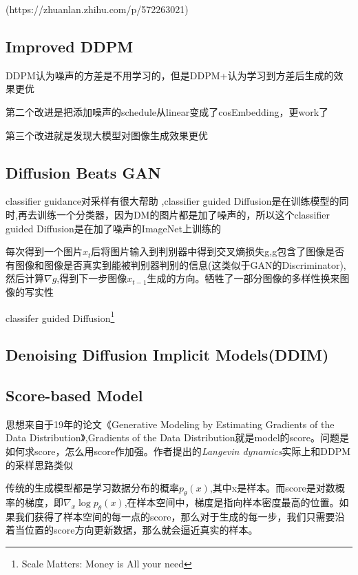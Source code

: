 \documentclass[12pt, a4paper, oneside]{ctexart}
\begin{document}
(https://zhuanlan.zhihu.com/p/572263021)





\subsection{Improved DDPM}
\par
DDPM认为噪声的方差是不用学习的，但是DDPM+认为学习到方差后生成的效果更优
\par
第二个改进是把添加噪声的schedule从linear变成了cosEmbedding，更work了
\par
第三个改进就是发现大模型对图像生成效果更优
\subsection{Diffusion Beats GAN}
\textcolor[rgb]{1,0,0}{classifier guidance对采样有很大帮助} ,classifier guided Diffusion是在训练模型的同时,再去训练一个分类器，因为DM的图片都是加了噪声的，所以这个classifier guided Diffusion是在加了噪声的ImageNet上训练的
\par
每次得到一个图片$x_t$后将图片输入到判别器中得到交叉熵损失g,g包含了图像是否有图像和图像是否真实到能被判别器判别的信息(这类似于GAN的Discriminator),然后计算$\nabla g$,得到下一步图像$x_{t-1}$生成的方向。牺牲了一部分图像的多样性换来图像的写实性
\par
classifer guided Diffusion\footnote{Scale Matters: Money is All your need}

\subsection{Denoising Diffusion Implicit Models(DDIM)}

\subsection{Score-based Model}
\par
思想来自于19年的论文《Generative Modeling by Estimating Gradients of the Data Distribution》,Gradients of the Data Distribution就是model的score。问题是如何求score，怎么用score作加强。作者提出的\emph{Langevin dynamics}实际上和DDPM的采样思路类似
\par
传统的生成模型都是学习数据分布的概率$p_{\theta}(x)$,其中x是样本。而score是对数概率的梯度，即$\nabla_x \log p_{\theta}(x)$,在样本空间中，梯度是指向样本密度最高的位置。如果我们获得了样本空间的每一点的score，那么对于生成的每一步，我们只需要沿着当位置的score方向更新数据，那么就会逼近真实的样本。
\par
\end{document}
